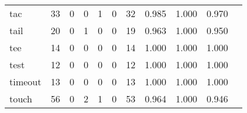 \begin{longtable}{lp{1.2cm}p{1.2cm}p{1.2cm}p{1.2cm}p{1.2cm}p{1.2cm}p{1.2cm}p{1.2cm}p{1.2cm}p{1.2cm}}
tac       &                                    33 &                                                  0 &                                                  0 &                                                  1 &                                                  0 &                                                 32 &                                              0.985 &                                              1.000 &                                              0.970 \\
tail      &                                    20 &                                                  0 &                                                  1 &                                                  0 &                                                  0 &                                                 19 &                                              0.963 &                                              1.000 &                                              0.950 \\
tee       &                                    14 &                                                  0 &                                                  0 &                                                  0 &                                                  0 &                                                 14 &                                              1.000 &                                              1.000 &                                              1.000 \\
test      &                                    12 &                                                  0 &                                                  0 &                                                  0 &                                                  0 &                                                 12 &                                              1.000 &                                              1.000 &                                              1.000 \\
timeout   &                                    13 &                                                  0 &                                                  0 &                                                  0 &                                                  0 &                                                 13 &                                              1.000 &                                              1.000 &                                              1.000 \\
touch     &                                    56 &                                                  0 &                                                  2 &                                                  1 &                                                  0 &                                                 53 &                                              0.964 &                                              1.000 &                                              0.946 \\

\end{longtable}
